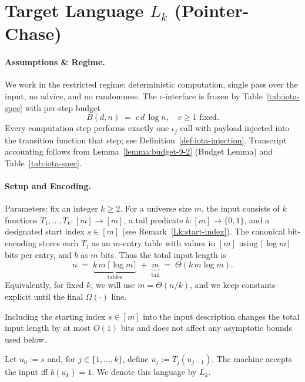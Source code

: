 
\section{Target Language \texorpdfstring{$L_k$}{Lk} (Pointer-Chase)}
\label{Lk:sec:Lk}

\paragraph{Assumptions \& Regime.}
We work in the restricted regime: deterministic computation, single pass over the input, no advice, and no randomness. The $\iota$-interface is frozen by Table~\ref{tab:iota-spec} with per-step budget
\[ B(d,n) \;=\; c\,d\,\log n, \quad c\ge 1 \text{ fixed.} \]
Every computation step performs exactly one $\iota_j$ call with payload injected into the transition function that step; see Definition~\ref{def:iota-injection}. Transcript accounting follows from Lemma~\ref{lemma:budget-9-2} (Budget Lemma) and Table~\ref{tab:iota-spec}.

\paragraph{Setup and Encoding.}
Parameters: fix an integer $k\ge 2$. For a universe size $m$, the input consists of $k$ functions $T_1,\ldots,T_k : [m]\to[m]$, a tail predicate $b:[m]\to\{0,1\}$, and a designated start index $s\in[m]$ (see Remark~\ref{Lk:start-index}). The canonical bit-encoding stores each $T_j$ as an $m$-entry table with values in $[m]$ using $\lceil\log m\rceil$ bits per entry, and $b$ as $m$ bits. Thus the total input length is
\[
 n \;=\; \underbrace{k\,m\,\lceil\log m\rceil}_{\text{tables}} \; + \; \underbrace{m}_{\text{tail}} \;=\; \Theta(k\,m\log m).
\]
Equivalently, for fixed $k$, we will use $m = \Theta(n/k)$, and we keep constants explicit until the final $\Omega(\cdot)$ line.

\begin{remark}\label{Lk:start-index}
Including the starting index $s\in[m]$ into the input description changes the total input length by at most $O(1)$ bits and does not affect any asymptotic bounds used below.
\end{remark}

\begin{definition}[Language $L_k$]
Let $u_0 := s$ and, for $j\in\{1,\ldots,k\}$, define $u_j := T_j(u_{j-1})$. The machine accepts the input iff $b(u_k)=1$. We denote this language by $L_k$.
\end{definition}

